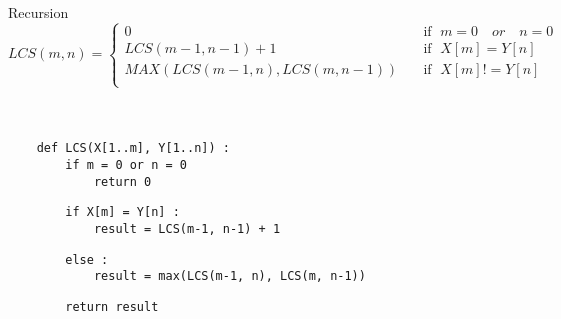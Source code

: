 \begin{frame}[fragile]{Recursion}
\scriptsize{
$
    LCS(m,n)=\begin{cases}
    0 \quad & \text{if }\; m = 0  \quad or \quad  n = 0 \\
    LCS(m-1, n-1) + 1  \quad & \text{if }\; X[m] = Y[n] \\
    MAX(LCS(m-1,n), LCS(m,n-1)) \quad &\text{if }\; X[m] != Y[n]  \\ 
     \end{cases}
$
}
\\~\
\\~\
\small{

    \begin{verbatim}
    def LCS(X[1..m], Y[1..n]) :
        if m = 0 or n = 0
            return 0
    \end{verbatim}
    \pause
    \begin{verbatim}
        if X[m] = Y[n] :
            result = LCS(m-1, n-1) + 1
    \end{verbatim}
    \pause
    \begin{verbatim}
        else :
            result = max(LCS(m-1, n), LCS(m, n-1))
    \end{verbatim}
    \pause
    \begin{verbatim}
        return result
    \end{verbatim}
}

\end{frame}







